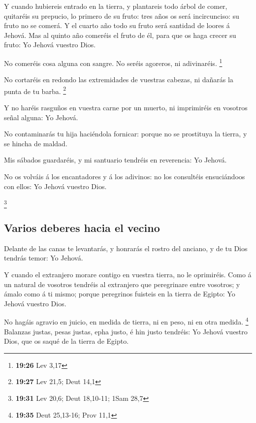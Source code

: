  Y cuando hubiereis entrado en la tierra, y plantareis
todo árbol de comer, quitaréis su prepucio, lo primero de su fruto: tres
años os será incircunciso: su fruto no se comerá.  Y el
cuarto año todo su fruto será santidad de loores á Jehová.
 Mas al quinto año comeréis el fruto de él, para que os
haga crecer su fruto: Yo Jehová vuestro Dios.

 No comeréis cosa alguna con sangre. No seréis agoreros,
ni adivinaréis. \footnote{\textbf{19:26} Lev 3,17}

 No cortaréis en redondo las extremidades de vuestras
cabezas, ni dañarás la punta de tu barba. \footnote{\textbf{19:27} Lev
  21,5; Deut 14,1}

 Y no haréis rasguños en vuestra carne por un muerto, ni
imprimiréis en vosotros señal alguna: Yo Jehová.

 No contaminarás tu hija haciéndola fornicar: porque no
se prostituya la tierra, y se hincha de maldad.

 Mis sábados guardaréis, y mi santuario tendréis en
reverencia: Yo Jehová.

 No os volváis á los encantadores y á los adivinos: no
los consultéis ensuciándoos con ellos: Yo Jehová vuestro Dios.

\footnote{\textbf{19:31} Lev 20,6; Deut 18,10-11; 1Sam 28,7}

\hypertarget{varios-deberes-hacia-el-vecino}{%
\subsection{Varios deberes hacia el
vecino}\label{varios-deberes-hacia-el-vecino}}

 Delante de las canas te levantarás, y honrarás el rostro
del anciano, y de tu Dios tendrás temor: Yo Jehová.

 Y cuando el extranjero morare contigo en vuestra tierra,
no le oprimiréis.  Como á un natural de vosotros tendréis
al extranjero que peregrinare entre vosotros; y ámalo como á ti mismo;
porque peregrinos fuisteis en la tierra de Egipto: Yo Jehová vuestro
Dios.

 No hagáis agravio en juicio, en medida de tierra, ni en
peso, ni en otra medida. \footnote{\textbf{19:35} Deut 25,13-16; Prov
  11,1}  Balanzas justas, pesas justas, epha justo, é hin
justo tendréis: Yo Jehová vuestro Dios, que os saqué de la tierra de
Egipto.

